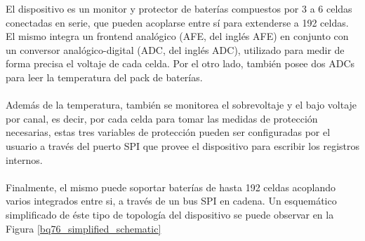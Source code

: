 \documentclass[10pt, a4paper]{report}
\begin{document}
\begin{minipage}{0.5\textwidth}
El dispositivo es un monitor y protector de bater\'ias compuestos por 3 a 6
celdas conectadas en serie, que pueden acoplarse entre s\'i para extenderse a 192
celdas. El mismo integra un frontend anal\'ogico (\acrshort{AFE}, del ingl\'es
\acrlong{AFE}) en conjunto con un conversor anal\'ogico-digital (\acrshort{ADC},
del ingl\'es \acrlong{ADC}), utilizado para medir de forma precisa el voltaje de
cada celda. Por el otro lado, tambi\'en posee dos \acrshort{ADC}s para leer la
temperatura del pack de bater\'ias.\\
\\
Adem\'as de la temperatura, tambi\'en  se monitorea el sobrevoltaje y el bajo
voltaje por canal, es decir, por cada celda para tomar las medidas de
protecci\'on necesarias, estas tres variables de protecci\'on pueden ser
configuradas por el usuario a trav\'es del puerto SPI que provee el dispositivo
para escribir los registros internos.\\
\\
Finalmente, el mismo puede soportar bater\'ias de hasta 192 celdas acoplando
varios integrados entre si, a trav\'es de un bus SPI en cadena. Un esquem\'atico
simplificado de \'este tipo de topolog\'ia del dispositivo se puede observar en
la Figura \ref{bq76_simplified_schematic}

\end{minipage}
\end{document}
